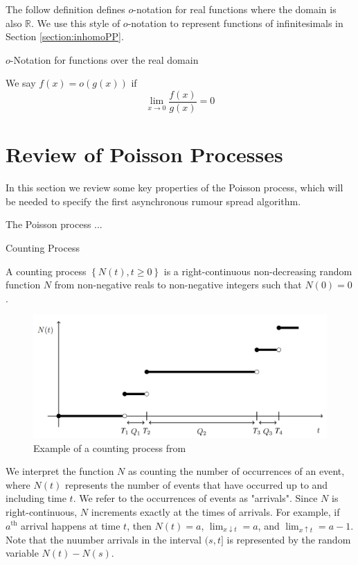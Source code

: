 The follow definition defines $o$-notation for real functions where the domain is also $\mathbb{R}$. We use this style of $o$-notation to represent functions of infinitesimals in Section  \ref{section:inhomoPP}.

\begin{definition}
	$o$-Notation for functions over the real domain

	\noindent
	We say $f(x) = o(g(x))$ if 
	$$
		\lim_{x \to 0} \frac{f(x)}{g(x)} = 0
	$$
\end{definition}



\section{Review of Poisson Processes}

In this section we review some key properties of the Poisson process, which will be needed to specify the first asynchronous rumour spread algorithm.

The Poisson process ...
\begin{definition}
	Counting Process

	\noindent
	A counting process $\left\{ N(t), t \geq 0 \right\}$ is a right-continuous non-decreasing random function $N$ from non-negative reals to non-negative integers such that $N(0) = 0$.
\end{definition}

\begin{figure}[h]
	\centering
	\includegraphics[width=\textwidth]{./figures/poisson_process_example.png}
	\caption{Example of a counting process from \cite{countingProcessFigure}}
	\label{fig:poissonProcessExample}
\end{figure}


We interpret the function $N$ as counting the number of occurrences of an event, where $N(t)$ represents the number of events that have occurred up to and including time $t$. We refer to the occurrences of events as "arrivals".  Since $N$ is right-continuous, $N$ increments exactly at the times of arrivals. For example, if $a^\text{th}$ arrival happens at time $t$, then $N(t) = a$, $\lim_{x \downarrow t} = a$, and $\lim_{x \uparrow t} = a - 1$. Note that the nuumber arrivals in the interval $(s, t]$ is represented by the random variable $N(t) - N(s)$. 

